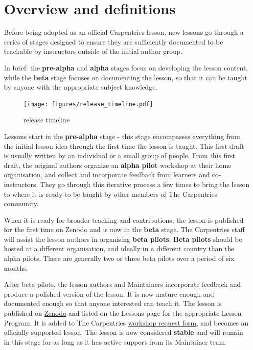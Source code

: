 \documentclass[]{book}
\begin{document}
\hypertarget{overview-and-definitions}{%
\section{Overview and definitions}\label{overview-and-definitions}}

Before being adopted as an official Carpentries lesson,
new lessons go through a series of stages designed to
ensure they are sufficiently documented to be teachable
by instructors outside of the initial author group.

In brief: the \textbf{pre-alpha} and \textbf{alpha} stages focus on
developing the lesson content, while the \textbf{beta} stage
focuses on documenting the lesson, so that it can be
taught by anyone with the appropriate subject knowledge.

\begin{figure}
\centering
\texttt{[image: figures/release\_timeline.pdf]}
\caption{\label{fig:release-timeline}release timeline}
\end{figure}

Lessons start in the \textbf{pre-alpha} stage - this stage
encompasses everything from the initial lesson idea
through the first time the lesson is taught. This
first draft is usually written by an individual
or a small group of people. From this first draft, the
original authors organize an \textbf{alpha pilot} workshop at
their home organisation, and collect and incorporate
feedback from learners and co-instructors. They go
through this iterative process a few times to bring the
lesson to where it is ready to be taught by other
members of The Carpentries community.

When it is ready for broader teaching and contributions,
the lesson is published for
the first time on Zenodo and is now in the \textbf{beta}
stage. The Carpentries staff will assist the lesson
authors in organising \textbf{beta pilots}.
\textbf{Beta pilots}
should be hosted at a different organisation, and
ideally in a different country than the alpha pilots.
There are generally two or three beta pilots over a
period of six months.

After beta pilots, the lesson authors and Maintainers
incorporate feedback and produce a polished version of
the lesson. It is now mature enough and
documented enough so that anyone interested can teach it. The lesson is published on \href{https://zenodo.org/communities/carpentries/?page=1\&size=20}{Zenodo} and listed on the
Lessons page for the appropriate
Lesson Program. It is added to The Carpentries
\href{http://carpentries.org/request-workshop}{workshop request form}, and becomes an officially
supported lesson. The lesson is now considered \textbf{stable} and will remain in this stage for as long
as it has active support from its Maintainer team.
\end{document}
